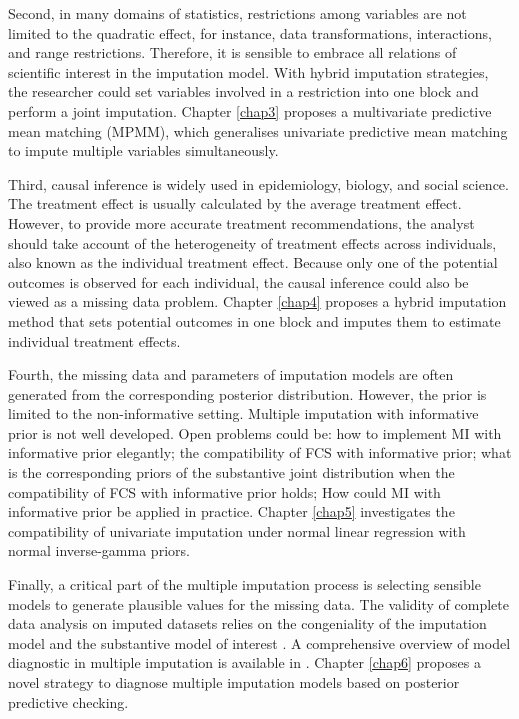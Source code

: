 Second, in many domains of statistics, restrictions among variables are not limited to the quadratic effect, for instance, data transformations, interactions, and range restrictions. Therefore, it is sensible to embrace all relations of scientific interest in the imputation model. With hybrid imputation strategies, the researcher could set variables involved in a restriction into one block and perform a joint imputation. Chapter \ref{chap3} proposes a multivariate predictive mean matching (MPMM), which generalises univariate predictive mean matching \citep{rubin1986statistical, little1988missing} to impute multiple variables simultaneously. 

Third, causal inference is widely used in epidemiology, biology, and social science. The treatment effect is usually calculated by the average treatment effect. However, to provide more accurate treatment recommendations, the analyst should take account of the heterogeneity of treatment effects across individuals, also known as the individual treatment effect. Because only one of the potential outcomes is observed for each individual, the causal inference could also be viewed as a missing data problem. Chapter \ref{chap4} proposes a hybrid imputation method that sets potential outcomes in one block and imputes them to estimate individual treatment effects.

Fourth, the missing data and parameters of imputation models are often generated from the corresponding posterior distribution. However, the prior is limited to the non-informative setting. Multiple imputation with informative prior is not well developed. Open problems could be: how to implement MI with informative prior elegantly; the compatibility of FCS with informative prior; what is the corresponding priors of the substantive joint distribution when the compatibility of FCS with informative prior holds; How could MI with informative prior be applied in practice. Chapter \ref{chap5} investigates the compatibility of univariate imputation under normal linear regression with normal inverse-gamma priors.

Finally, a critical part of the multiple imputation process is selecting sensible models to generate plausible values for the missing data. The validity of complete data analysis on imputed datasets relies on the congeniality of the imputation model and the substantive model of interest \citep{meng1994multiple}. A comprehensive overview of model diagnostic in multiple imputation is available in \citet{nguyen2017model}. Chapter \ref{chap6} proposes a novel strategy to diagnose multiple imputation models based on posterior predictive checking. 

